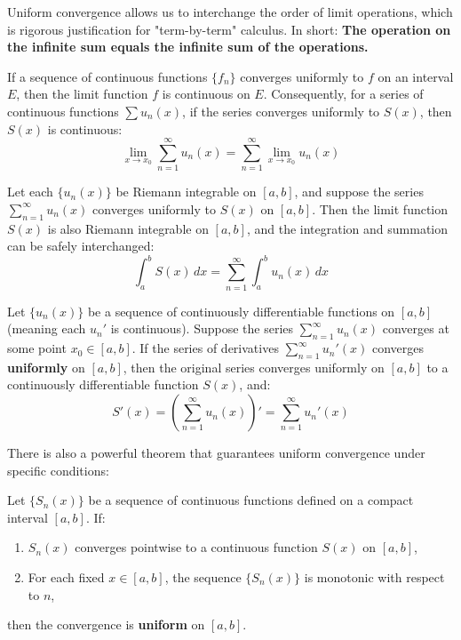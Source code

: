 Uniform convergence allows us to interchange the order of limit operations, which is rigorous justification for "term-by-term" calculus. In short: \textbf{The operation on the infinite sum equals the infinite sum of the operations.}

\begin{theorem}[Continuity]
If a sequence of continuous functions $\{f_n\}$ converges uniformly to $f$ on an interval $E$, then the limit function $f$ is continuous on $E$.
Consequently, for a series of continuous functions $\sum u_n(x)$, if the series converges uniformly to $S(x)$, then $S(x)$ is continuous:
\[ \lim_{x \to x_0} \sum_{n=1}^{\infty} u_n(x) = \sum_{n=1}^{\infty} \lim_{x \to x_0} u_n(x) \]
\end{theorem}

\begin{theorem}
Let each $\{u_n(x)\}$ be Riemann integrable on $[a, b]$, and suppose the series $\sum_{n=1}^{\infty} u_n(x)$ converges uniformly to $S(x)$ on $[a, b]$. Then the limit function $S(x)$ is also Riemann integrable on $[a, b]$, and the integration and summation can be safely interchanged:
\[ \int_a^b S(x) \, dx = \sum_{n=1}^{\infty} \int_a^b u_n(x) \, dx \]
\end{theorem}

\begin{theorem}
Let $\{u_n(x)\}$ be a sequence of continuously differentiable functions on $[a, b]$ (meaning each $u_n'$ is continuous). Suppose the series $\sum_{n=1}^{\infty} u_n(x)$ converges at some point $x_0 \in [a, b]$. If the series of derivatives $\sum_{n=1}^{\infty} u_n'(x)$ converges \textbf{uniformly} on $[a, b]$, then the original series converges uniformly on $[a, b]$ to a continuously differentiable function $S(x)$, and:
\[ S'(x) = \left( \sum_{n=1}^{\infty} u_n(x) \right)' = \sum_{n=1}^{\infty} u_n'(x) \]
\end{theorem}

There is also a powerful theorem that guarantees uniform convergence under specific conditions:

\begin{theorem}
Let $\{S_n(x)\}$ be a sequence of continuous functions defined on a compact interval $[a, b]$. If:
\begin{enumerate}
    \item $S_n(x)$ converges pointwise to a continuous function $S(x)$ on $[a, b]$,
    \item For each fixed $x \in [a, b]$, the sequence $\{S_n(x)\}$ is monotonic with respect to $n$,
\end{enumerate}
then the convergence is \textbf{uniform} on $[a, b]$.
\end{theorem}

